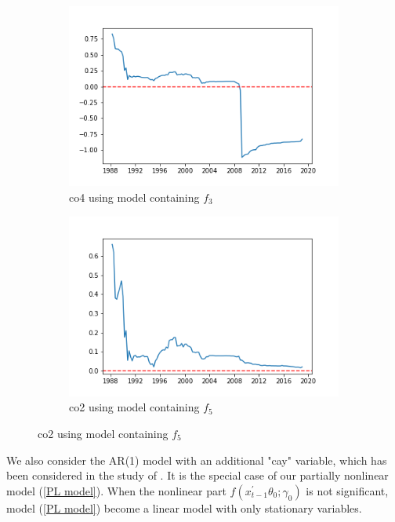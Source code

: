 \documentclass[a4paper,12pt,times,numbered,print,index]{report}
\numberwithin{equation}{section}
\begin{document}
\begin{figure}[!htbp]
	\centering
	\caption{OOS Performance (Benchmark: AR(2) Models)}
	\begin{subfigure}[b]{0.42\linewidth}
	\includegraphics[width=1.2\linewidth]{plots/co4_AR2_g3.png}
	\caption{co4 using model containing $f_3$}
	\end{subfigure}
	\begin{subfigure}[b]{0.42\linewidth}
	\includegraphics[width=1.2\linewidth]{plots/co2_AR2_g5.png}
	\caption{co2 using model containing $f_5$}
	\end{subfigure}
	\label{vsar2}
\end{figure}

We also consider the AR(1) model with an additional "cay" variable, which has been considered in the study of \cite{lettau2001consumption}. It is the special case of our partially nonlinear model (\ref{PL model}). When the nonlinear part $f\left( x_{t-1}^{\prime }\theta_0; \gamma_0\right)$ is not significant, model (\ref{PL model}) become a linear model with only stationary variables. 
\end{document}
